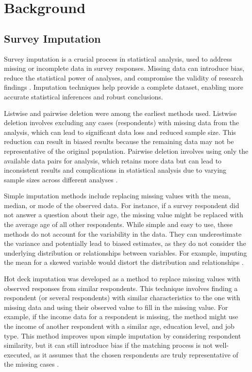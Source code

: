 \section{Background}

\subsection{Survey Imputation}
Survey imputation is a crucial process in statistical analysis, used to address missing or incomplete data in survey responses. Missing data can introduce bias, reduce the statistical power of analyses, and compromise the validity of research findings \cite{little2019statistical, Schafer1999MultipleIA}. Imputation techniques help provide a complete dataset, enabling more accurate statistical inferences and robust conclusions.

Listwise and pairwise deletion were among the earliest methods used. Listwise deletion involves excluding any cases (respondents) with missing data from the analysis, which can lead to significant data loss and reduced sample size. This reduction can result in biased results because the remaining data may not be representative of the original population. Pairwise deletion involves using only the available data pairs for analysis, which retains more data but can lead to inconsistent results and complications in statistical analysis due to varying sample sizes across different analyses \cite{kang2013prevention}.

Simple imputation methods include replacing missing values with the mean, median, or mode of the observed data. For instance, if a survey respondent did not answer a question about their age, the missing value might be replaced with the average age of all other respondents. While simple and easy to use, these methods do not account for the variability in the data. They can underestimate the variance and potentially lead to biased estimates, as they do not consider the underlying distribution or relationships between variables. For example, imputing the mean for a skewed variable would distort the distribution and relationships \cite{little2019statistical}.

Hot deck imputation was developed as a method to replace missing values with observed responses from similar respondents. This technique involves finding a respondent (or several respondents) with similar characteristics to the one with missing data and using their observed value to fill in the missing value. For example, if the income data for a respondent is missing, the method might use the income of another respondent with a similar age, education level, and job type. This method improves upon simple imputation by considering respondent similarity, but it can still introduce bias if the matching process is not well-executed, as it assumes that the chosen respondents are truly representative of the missing cases \cite{andridge2010review}.

